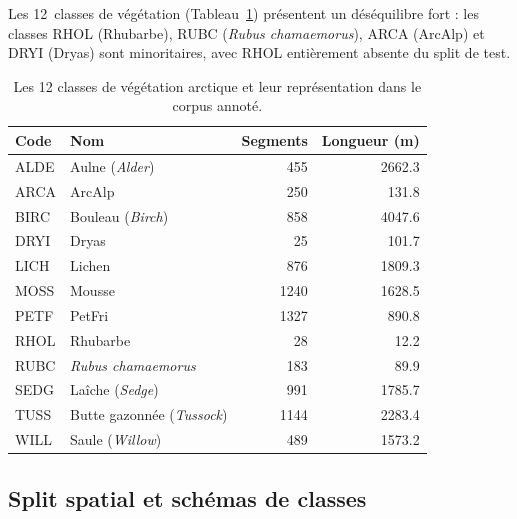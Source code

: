 \documentclass[11pt,a4paper]{article}
\begin{document}
Les 12~classes de végétation (Tableau~\ref{tab:classes}) présentent un déséquilibre fort : les classes RHOL (Rhubarbe), RUBC (\emph{Rubus chamaemorus}), ARCA (ArcAlp) et DRYI (Dryas) sont minoritaires, avec RHOL entièrement absente du split de test.

\begin{table}[H]
	\centering
	\caption{Les 12 classes de végétation arctique et leur représentation dans le corpus annoté.}
	\label{tab:classes}
	\begin{tabular}{llrr}
		\toprule
		\textbf{Code} & \textbf{Nom}                    & \textbf{Segments} & \textbf{Longueur (m)} \\
		\midrule
		ALDE          & Aulne (\emph{Alder})            & 455               & 2662.3                \\
		ARCA          & ArcAlp                          & 250               & 131.8                 \\
		BIRC          & Bouleau (\emph{Birch})          & 858               & 4047.6                \\
		DRYI          & Dryas                           & 25                & 101.7                 \\
		LICH          & Lichen                          & 876               & 1809.3                \\
		MOSS          & Mousse                          & 1240              & 1628.5                \\
		PETF          & PetFri                          & 1327              & 890.8                 \\
		RHOL          & Rhubarbe                        & 28                & 12.2                  \\
		RUBC          & \emph{Rubus chamaemorus}        & 183               & 89.9                  \\
		SEDG          & Laîche (\emph{Sedge})           & 991               & 1785.7                \\
		TUSS          & Butte gazonnée (\emph{Tussock}) & 1144              & 2283.4                \\
		WILL          & Saule (\emph{Willow})           & 489               & 1573.2                \\
		\bottomrule
	\end{tabular}
\end{table}

\subsection{Split spatial et schémas de classes}
\end{document}
